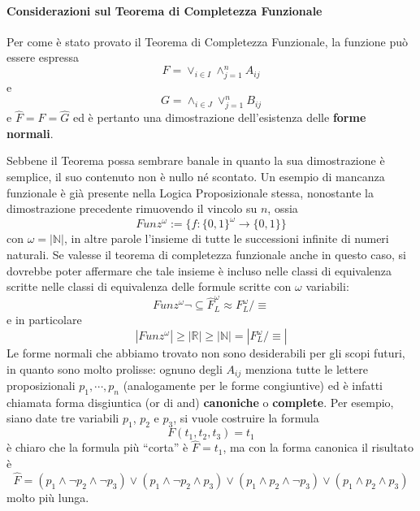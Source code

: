 \paragraph{Considerazioni sul Teorema di Completezza Funzionale}
Per come è stato provato il Teorema di Completezza Funzionale, la funzione può 
essere espressa 
$$
F = \lor_{i \in I} \land_{j = 1}^{n} A_{ij}
$$
e 
$$
G = \land_{i \in J} \lor_{j = 1}^{n} B_{ij}
$$
e $\hat{F} = F = \hat{G}$ ed è pertanto una dimostrazione dell'esistenza 
delle \textbf{forme normali}. 

Sebbene il Teorema possa sembrare banale in quanto la sua dimostrazione è
semplice, il suo contenuto non è nullo né scontato. Un esempio di mancanza 
funzionale è già presente nella Logica Proposizionale stessa, nonostante 
la dimostrazione precedente rimuovendo il vincolo su $n$, ossia 
$$
Funz^{\omega} := \{f:\{0,1\}^{\omega} \rightarrow \{0,1\}\}
$$
con $\omega = |\mathbb{N}|$, in altre parole l'insieme di tutte le successioni 
infinite di numeri naturali. Se valesse il teorema di completezza funzionale 
anche in questo caso, si dovrebbe poter affermare che tale insieme 
è incluso nelle classi di equivalenza scritte nelle classi di equivalenza 
delle formule scritte con $\omega$ variabili: 
$$
Funz^{\omega} \neg \subseteq \hat{F}^{\omega}_{L} \approx F_L^{\omega}/\equiv
$$
e in particolare 
$$
|Funz^{\omega}| \geq |\mathbb{R}| \geq |\mathbb{N}| = |F_L^{\omega}/\equiv|
$$
Le forme normali che abbiamo trovato non sono desiderabili per gli scopi 
futuri, in quanto sono molto prolisse: ognuno degli $A_{ij}$ menziona 
tutte le lettere proposizionali $p_1, \cdots, p_n$ (analogamente per le 
forme congiuntive) ed è infatti chiamata forma disgiuntica (or di and) 
\textbf{canoniche} o \textbf{complete}. Per esempio, siano date tre variabili 
$p_1$, $p_2$ e $p_3$, si vuole costruire la formula 
$$
F(t_1, t_2, t_3) = t_1
$$
è chiaro che la formula più ``corta'' è $\hat{F} = t_1$, ma con la forma 
canonica il risultato è 
$$
\hat{F} = (p_1 \land \neg p_2 \land \neg p_3) \lor (p_1 \land \neg p_2 \land p_3) \lor (p_1 \land p_2 \land \neg p_3) \lor (p_1 \land p_2 \land p_3)
$$
molto più lunga.
